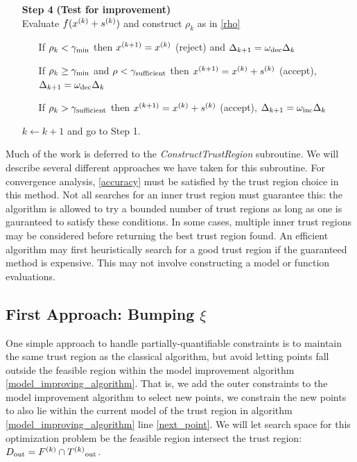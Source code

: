 \begin{algorithm}[H]
\begin{itemize}
        \item[\textbf{Step 4}] \textbf{(Test for improvement)} \\
            Evaluate $f({x}^{(k)} + {s}^{(k)})$ and construct $\rho_k$ as in \cref{rho} \begin{itemize}
                \item[] If $\rho_k < \gamma_{\text{min}}$ then ${x}^{(k+1)}={x}^{(k)}$ (reject) and $\Delta_{k+1} = \omega_{\text{dec}}\Delta_{k}$
                \item[] If $\rho_k \ge \gamma_{\text{min}}$ and $\rho < \gamma_{\text{sufficient}}$ then ${x}^{(k+1)}={x}^{(k)}+{s}^{(k)}$ (accept), $\Delta_{k+1} = \omega_{\text{dec}}\Delta_{k}$
                \item[] If $\rho_k > \gamma_{\text{sufficient}}$ then ${x}^{(k+1)}={x}^{(k)}+{s}^{(k)}$ (accept), $\Delta_{k+1} = \omega_{\text{inc}}\Delta_{k}$
            \end{itemize}
            $k \gets k+1$ and go to Step 1.
    \end{itemize}
\end{algorithm}

Much of the work is deferred to the \emph{ConstructTrustRegion} subroutine.
We will describe several different approaches we have taken for this subroutine.
For convergence analysis, \cref{accuracy} must be satisfied by the trust region choice in this method.
Not all searches for an inner trust region must guarantee this: the algorithm is allowed to try a bounded number of trust regions as long as one is gauranteed to satisfy these conditions.
In some cases, multiple inner trust regions may be considered before returning the best trust region found.
An efficient algorithm may first heuristically search for a good trust region if the guaranteed method is expensive.
This may not involve constructing a model or function evaluations.


\subsection{First Approach: Bumping $\xi$}
One simple approach to handle partially-quantifiable constraints is to maintain the same trust region as the classical algorithm, but avoid letting points fall outside the feasible region within the model improvement algorithm \cref{model_improving_algorithm}.
That is, we add the outer constraints to the model improvement algorithm to select new points, we constrain the new points to also lie within the current model of the trust region in algorithm \cref{model_improving_algorithm} line \cref{next_point}.
We will let search space for this optimization problem be the feasible region intersect the trust region: $D_{\text{out}} = {F}^{(k)} \cap {T^{(k)}}_{\text{out}} $.

